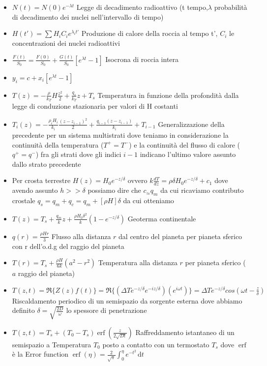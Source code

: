 \documentclass[a4paper]{article}
\DeclareMathOperator \erf{erf} %
\begin{document}
\begin{itemize}
	\item $N(t) = N(0) e^{-\lambda t}$ Legge di decadimento radioattivo (t tempo,$\lambda$ probabilità di decadimento dei nuclei nell'intervallo di tempo)
	\item $H(t')= \sum H_i C_i e^{\lambda_i t'} $ Produzione di calore della roccia al tempo t', $C_i$ le concentrazioni dei nuclei radioattivi
	\item $\frac{F(t)}{S_0}=\frac{F(0)}{S_0}+\frac{G(t)}{S_0}[e^{\lambda t}-1]$ Isocrona di roccia intera
	\item $y_i=c+x_i[e^{\lambda t}-1]$
	\item $T(z)=-\frac{\rho}{k_T}H \frac{z^2}{2}+ \frac{q_s}{k_T}z+T_s$ Temperatura in funzione della profondità dalla legge di conduzione stazionaria per valori di H costanti
	\item $T_i(z)=-\frac{\rho_i H_i}{k_i} \frac{(z-z_{i-1})^2}{2} + \frac{q_{i-1}(z-z_{i-1})}{k_i}+T_{i - 1}$ Generalizzazione della precedente per un sistema multistrati dove teniamo in considerazione la continuità della temperatura ($T^+=T^-$) e la continuità del flusso di calore ($q^+=q^-$) fra gli strati dove gli indici $i-1$ indicano l'ultimo valore assunto dallo strato precedente
	\item Per crosta terrestre $H(z)=H_0 e^{-z/\delta} $ ovvero $k\frac{dT}{dz}=\rho \delta H_0 e^{-z/\delta}+c_1$ dove avendo assunto $h>>\delta$ possiamo dire che $c_ \approx q_m$ da cui ricaviamo contributo crostale $q_s=q_m+q_c=q_m+[\rho H] \delta$ da cui otteniamo
	\item $T(z)=T_s+\frac{q_m}{k} z+\frac{\rho H_0 \delta^2}{k} (1-e^{-z/\delta})$ Geoterma continentale
	\item $q(r)=\frac{\rho H r}{3}$ Flusso alla distanza $r$ dal centro del pianeta per pianeta sferico con r dell'o.d.g del raggio del pianeta
	\item $T(r)=T_s+\frac{\rho H}{6 k}(a^2-r^2)$ Temperatura alla distanza $r$ per pianeta sferico ($a$ raggio del pianeta)
	\item $T(z,t)=\Re \{Z(z)f(t)\} = \Re \{(\Delta T e^{-z/\delta}e^{-iz/\delta})(e^{i \omega t})\} =
	\Delta T e^{-z/\delta} cos(\omega t - \frac{z}{\delta})$ Riscaldamento periodico di un semispazio da sorgente esterna dove abbiamo definito $\delta = \sqrt{\frac{2D}{\omega}}$ lo spessore di penetrazione
	\item $T(z,t) = T_s + (T_0 - T_s) \erf(\frac{z}{2 \sqrt{Dt}})$ Raffreddamento istantaneo di un semispazio a Temperatura $T_0$ posto a contatto con un termostato $T_s$ dove $\erf$ è la Error function $\erf (\eta)= \frac{2}{\sqrt{\pi}}\int_0^\eta e^{-t^2}\,\mathrm dt$

\end{itemize}
\end{document}
